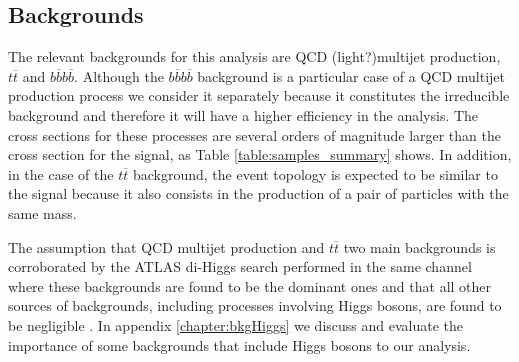

\subsection{Backgrounds}

The relevant backgrounds for this analysis are QCD (light?)multijet production, $t\overline{t}$ and $b\overline{b}b\overline{b}$. Although the $b\overline{b}b\overline{b}$ background is a particular case of a QCD multijet production process we consider it separately because it constitutes the irreducible background and therefore it will have a higher efficiency in the analysis. The cross sections for these processes are several orders of magnitude larger than the cross section for the signal, as Table \ref{table:samples_summary} shows. In addition, in the case of the $t\overline{t}$ background, the event topology is expected to be similar to the signal because it also consists in the production of a pair of particles with the same mass.

The assumption that QCD multijet production and $t\overline{t}$ two main backgrounds is corroborated by the ATLAS di-Higgs search performed in the same channel where these backgrounds are found to be the dominant ones and that all other sources of backgrounds, including processes involving Higgs bosons, are found to be negligible \cite{hh2bbbbATLAS}. In appendix \ref{chapter:bkgHiggs} we discuss and evaluate the importance of some backgrounds that include Higgs bosons to our analysis.

